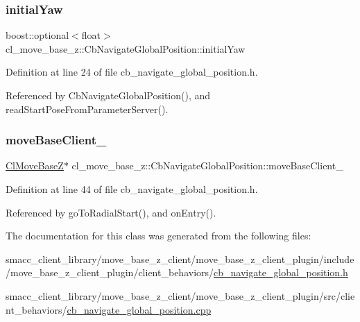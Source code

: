 \subsubsection{\texorpdfstring{initial\+Yaw}{initialYaw}}
{\footnotesize\ttfamily boost\+::optional$<$float$>$ cl\+\_\+move\+\_\+base\+\_\+z\+::\+Cb\+Navigate\+Global\+Position\+::initial\+Yaw}



Definition at line 24 of file cb\+\_\+navigate\+\_\+global\+\_\+position.\+h.



Referenced by Cb\+Navigate\+Global\+Position(), and read\+Start\+Pose\+From\+Parameter\+Server().

\mbox{\label{classcl__move__base__z_1_1CbNavigateGlobalPosition_a460d6b43834cb52baa94d22cd3a6fd2b}} 
\subsubsection{\texorpdfstring{move\+Base\+Client\+\_\+}{moveBaseClient\_}}
{\footnotesize\ttfamily \hyperlink{classcl__move__base__z_1_1ClMoveBaseZ}{Cl\+Move\+BaseZ}$\ast$ cl\+\_\+move\+\_\+base\+\_\+z\+::\+Cb\+Navigate\+Global\+Position\+::move\+Base\+Client\+\_\+\hspace{0.3cm}{\ttfamily [private]}}



Definition at line 44 of file cb\+\_\+navigate\+\_\+global\+\_\+position.\+h.



Referenced by go\+To\+Radial\+Start(), and on\+Entry().



The documentation for this class was generated from the following files\+:\begin{DoxyCompactItemize}
\item 
smacc\+\_\+client\+\_\+library/move\+\_\+base\+\_\+z\+\_\+client/move\+\_\+base\+\_\+z\+\_\+client\+\_\+plugin/include/move\+\_\+base\+\_\+z\+\_\+client\+\_\+plugin/client\+\_\+behaviors/\hyperlink{cb__navigate__global__position_8h}{cb\+\_\+navigate\+\_\+global\+\_\+position.\+h}\item 
smacc\+\_\+client\+\_\+library/move\+\_\+base\+\_\+z\+\_\+client/move\+\_\+base\+\_\+z\+\_\+client\+\_\+plugin/src/client\+\_\+behaviors/\hyperlink{cb__navigate__global__position_8cpp}{cb\+\_\+navigate\+\_\+global\+\_\+position.\+cpp}\end{DoxyCompactItemize}
